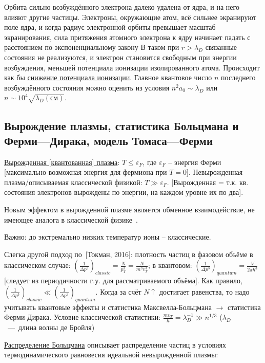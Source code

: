 \documentclass[10pt, a4paper]{article}
\newcommand{\Tokman}{~[Токман, 2016]}
\begin{document}
Орбита сильно возбуждённого электрона далеко удалена от ядра, и на него влияют другие частицы. Электроны, окружающие атом, всё сильнее экранируют поле ядра, и когда радиус электронной орбиты превышает масштаб экранирования, сила притяжения атомного электрона к ядру начинает падать с расстоянием по экспоненциальному закону В таком при $r>\lambda_D$ связанные состояния не реализуются, и электрон становится свободным при энергии возбуждения, меньшей потенциала ионизации изолированного атома. Происходит как бы \uline{снижение потенциала ионизации}. Главное квантовое число $n$ последнего возбуждённого состояния можно оценить из условия $n^2a_0 \sim \lambda_D$ или $n \sim 10^4\sqrt{\lambda_D(\text{см})}$.

\subsection{Вырождение плазмы, статистика Больцмана и Ферми—Дирака, модель Томаса—Ферми}

\uline{Вырожденная [квантованная] плазма}: $T \leq \varepsilon_F$, где $\varepsilon_F$ -- энергия Ферми [максимально возможная энергия для фермиона при $T=0$]. Невырожденная плазма/описываемая классической физикой: $T \gg \varepsilon_F$. [Вырожденная = т.к. кв. состояния электронов вырождены по энергии, на каждом уровне их по два].

Новым эффектом в вырожденной плазме является обменное взаимодействие, не имеющее аналога в классической физике~\cite{kotelnikov}.

Важно: до экстремально низких температур ионы -- классические.

Слегка другой подход по\Tokman: плотность частиц в фазовом объёме в классическом случае: $\left( \frac{1}{\Delta p^3}\right)_{classic} = \frac{N}{p_T^3} = \frac{N}{m^3v_T^3}$; в квантовом: $\left(\frac{1}{\Delta p^3}\right)_{quantum} = \frac{V}{2 \pi \hbar^3}$ [следует из периодичности г.у. для рассматриваемого объёма]. Как правило, $\left( \frac{1}{\Delta p^3}\right)_{classic} \ll \left(\frac{1}{\Delta p^3}\right)_{quantum}$. Когда за счёт $N\uparrow$ достигает равенства, то надо учитывать квантовые эффекты и статистика Максвелла-Больцмана $\rightarrow$ статистика Ферми-Дирака. Условие классической статистики: $\frac{mv_T}{\hbar} = \lambda_D^{-1} \gg n^{1/3}$ ($\lambda_D$~---~длина волны де Бройля)

\uline{Распределение Больцмана} описывает распределение частиц в условиях термодинамического равновесия идеальной невырожденной плазмы:
\end{document}
